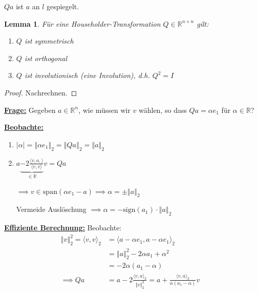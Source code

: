 \documentclass{book}
\newtheorem{lemma}[algorithm]{Lemma}
\def\R{\mathbb{R}}
\begin{document}
            $Qa$ ist $a$ an $l$ gespiegelt.

            \begin{lemma}\label{l2.17}
                Für eine Householder-Transformation $Q\in\R^{n\times n}$ gilt:
                \begin{enumerate}
                    \item $Q$ ist symmetrisch
                    \item $Q$ ist orthogonal
                    \item $Q$ ist involutionisch (eine Involution), d.h. $Q^2=I$
                \end{enumerate}
            \end{lemma}
            \begin{proof} %
                Nachrechnen.
            \end{proof}

            \underline{\textbf{Frage:}} Gegeben $a\in\R^n$, wie müssen wir $v$ wählen, so dass $Qa=\alpha e_1$ für $\alpha\in\R$?


            \underline{\textbf{Beobachte:}}

            \begin{enumerate}
                \item $\left\vert \alpha \right\vert=\left\Vert \alpha e_1 \right\Vert_2 = \left\Vert Qa \right\Vert_2 = \left\Vert a \right\Vert_2$
                \item $a\underbrace{-2\frac{\langle v,a, \rangle}{\langle v,v \rangle}}_{\in\R}v=Qa$
            
                $\implies v\in\text{span}(\alpha e_1-a) \implies \alpha =\pm\left\Vert a \right\Vert_2$ %

                Vermeide Auslöschung $\implies \alpha=-\text{sign}(a_1)\cdot\left\Vert a \right\Vert_2$
            \end{enumerate}

            \underline{\textbf{Effiziente Berechnung:}} Beobachte:
            \begin{align*}
                \left\Vert v \right\Vert_2^2 = \langle v,v \rangle_2 &= \langle  a-\alpha e_1, a-\alpha e_1  \rangle_2&\\
                &=\left\Vert a \right\Vert_2^2-2\alpha a_1 +\alpha^2&\\
                &=-2\alpha(a_1-\alpha)&\\
                \implies Qa &= a-2\frac{\langle v,a \rangle_2}{\left\Vert v \right\Vert_2^2}=a+\frac{\langle v,a \rangle_2}{\alpha(a_1-\alpha)}v&
            \end{align*}
\end{document}
